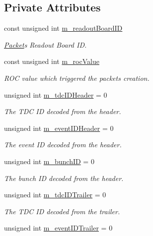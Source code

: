 \subsection*{Private Attributes}
\begin{DoxyCompactItemize}
\item 
const unsigned int \hyperlink{class_packet_af10be9c0821e98433b534b17017081db}{m\+\_\+readout\+Board\+ID}
\begin{DoxyCompactList}\small\item\em \hyperlink{class_packet}{Packet}\textquotesingle{}s Readout Board ID. \end{DoxyCompactList}\item 
const unsigned int \hyperlink{class_packet_ac4587a52a089f8fa1b7a899e4b46cb7d}{m\+\_\+roc\+Value}
\begin{DoxyCompactList}\small\item\em R\+OC value which triggered the packet\textquotesingle{}s creation. \end{DoxyCompactList}\item 
unsigned int \hyperlink{class_packet_a0f39ba4b6d5a8732381c1bcbbeeb7eb9}{m\+\_\+tdc\+I\+D\+Header} = 0
\begin{DoxyCompactList}\small\item\em The T\+DC ID decoded from the header. \end{DoxyCompactList}\item 
unsigned int \hyperlink{class_packet_a3abf93570be0669506f39b391bc574ca}{m\+\_\+event\+I\+D\+Header} = 0
\begin{DoxyCompactList}\small\item\em The event ID decoded from the header. \end{DoxyCompactList}\item 
unsigned int \hyperlink{class_packet_ad0a2dce379a45ee0f899d495f5e760fc}{m\+\_\+bunch\+ID} = 0
\begin{DoxyCompactList}\small\item\em The bunch ID decoded from the header. \end{DoxyCompactList}\item 
unsigned int \hyperlink{class_packet_aad739524a3b965eef89c827339b2e1f2}{m\+\_\+tdc\+I\+D\+Trailer} = 0
\begin{DoxyCompactList}\small\item\em The T\+DC ID decoded from the trailer. \end{DoxyCompactList}\item 
unsigned int \hyperlink{class_packet_ae32fc3c9665b68f00dabd9327d4c84c6}{m\+\_\+event\+I\+D\+Trailer} = 0

\end{DoxyCompactItemize}

